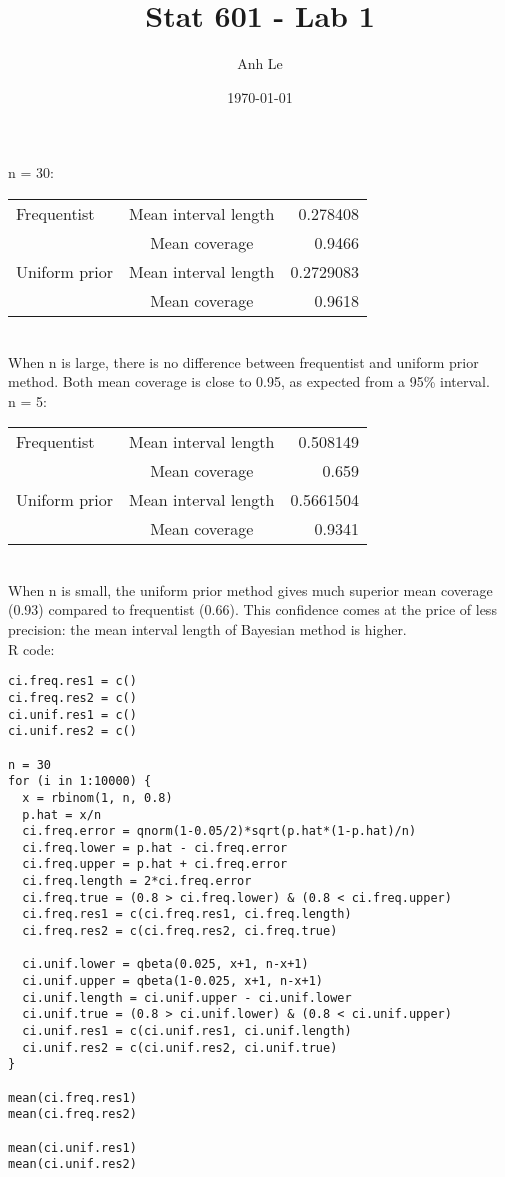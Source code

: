\documentclass{article}
\title{Stat 601 - Lab 1}
\author{Anh Le}
\date{\today}
\begin{document}
\maketitle

n = 30:\\
\begin{tabular}{l c r}
Frequentist & Mean interval length & 0.278408 \\
& Mean coverage & 0.9466 \\
Uniform prior & Mean interval length & 0.2729083 \\
& Mean coverage & 0.9618 \\
\end{tabular}\\
When n is large, there is no difference between frequentist and uniform prior method. Both mean coverage is close to 0.95, as expected from a 95\% interval.\\

n = 5:\\
\begin{tabular}{l c r}
Frequentist & Mean interval length & 0.508149 \\
& Mean coverage & 0.659 \\
Uniform prior & Mean interval length & 0.5661504 \\
& Mean coverage & 0.9341 \\
\end{tabular}\\
When n is small, the uniform prior method gives much superior mean coverage (0.93) compared to frequentist (0.66). This confidence comes at the price of less precision: the mean interval length of Bayesian method is higher.\\

R code:\\
\begin{verbatim}
ci.freq.res1 = c()
ci.freq.res2 = c()
ci.unif.res1 = c()
ci.unif.res2 = c()

n = 30
for (i in 1:10000) {
  x = rbinom(1, n, 0.8)
  p.hat = x/n
  ci.freq.error = qnorm(1-0.05/2)*sqrt(p.hat*(1-p.hat)/n)
  ci.freq.lower = p.hat - ci.freq.error
  ci.freq.upper = p.hat + ci.freq.error
  ci.freq.length = 2*ci.freq.error
  ci.freq.true = (0.8 > ci.freq.lower) & (0.8 < ci.freq.upper)
  ci.freq.res1 = c(ci.freq.res1, ci.freq.length)
  ci.freq.res2 = c(ci.freq.res2, ci.freq.true)

  ci.unif.lower = qbeta(0.025, x+1, n-x+1)
  ci.unif.upper = qbeta(1-0.025, x+1, n-x+1)
  ci.unif.length = ci.unif.upper - ci.unif.lower
  ci.unif.true = (0.8 > ci.unif.lower) & (0.8 < ci.unif.upper)
  ci.unif.res1 = c(ci.unif.res1, ci.unif.length)
  ci.unif.res2 = c(ci.unif.res2, ci.unif.true)
}

mean(ci.freq.res1)
mean(ci.freq.res2)

mean(ci.unif.res1)
mean(ci.unif.res2)
\end{verbatim}
\end{document}
